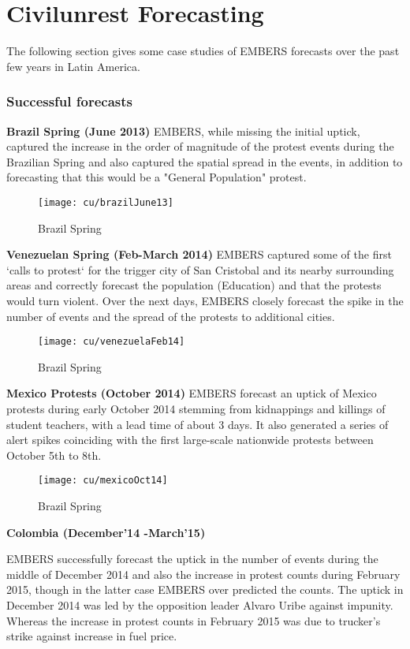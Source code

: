 \section{Civilunrest Forecasting}
The following section gives some case studies of EMBERS forecasts over
the past few years in Latin America.
\subsubsection{Successful forecasts}
\textbf{Brazil Spring (June 2013)}
EMBERS, while missing the initial uptick, captured the increase in the order of
magnitude of the protest events during the Brazilian Spring and also captured
the spatial spread in the events, in addition to forecasting that this would be
a "General Population" protest.
\begin{figure}[H]
\texttt{[image: cu/brazilJune13]}
\caption{Brazil Spring}
\label{fig:brazilJune13}
\end{figure}


\textbf{Venezuelan Spring (Feb-March 2014)}
EMBERS captured some of the first `calls to protest` for the trigger city of
San Cristobal and its nearby surrounding areas and correctly forecast the
population (Education) and that the protests would turn violent. Over the next
days, EMBERS closely forecast the spike in the number of events and the spread
of the protests to additional cities.
   
\begin{figure}[H]
\texttt{[image: cu/venezuelaFeb14]}
\caption{Brazil Spring}
\label{fig:venezuelaMarch14}
\end{figure}

\textbf{Mexico Protests (October 2014)}
EMBERS forecast an uptick of Mexico protests during early October 2014 stemming
from kidnappings and killings of student teachers, with a lead time of about 3
days. It also generated  a series of alert spikes coinciding with the first
large-scale nationwide protests between October 5th to 8th.
\begin{figure}[H]
\texttt{[image: cu/mexicoOct14]}
\caption{Brazil Spring}
\label{fig:mexicoOct14}
\end{figure}

\textbf{Colombia (December'14 -March'15)}

EMBERS successfully forecast the uptick in the number of events during the
middle of December 2014 and also the increase in protest counts during February
2015, though in the latter case EMBERS over predicted the counts. The uptick in
December 2014 was led by the opposition leader Alvaro Uribe against impunity.
Whereas the increase in  protest counts in February 2015
was due to trucker’s strike against increase in fuel price.

